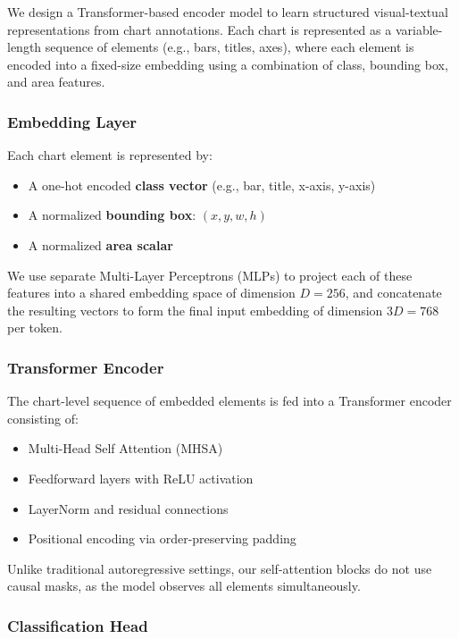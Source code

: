 \documentclass[11pt]{article}
\begin{document}
We design a Transformer-based encoder model to learn structured visual-textual representations from chart annotations. Each chart is represented as a variable-length sequence of elements (e.g., bars, titles, axes), where each element is encoded into a fixed-size embedding using a combination of class, bounding box, and area features.

\subsubsection*{Embedding Layer}

Each chart element is represented by:
\begin{itemize}
    \item A one-hot encoded \textbf{class vector} (e.g., bar, title, x-axis, y-axis)
    \item A normalized \textbf{bounding box}: $(x, y, w, h)$
    \item A normalized \textbf{area scalar}
\end{itemize}

We use separate Multi-Layer Perceptrons (MLPs) to project each of these features into a shared embedding space of dimension $D=256$, and concatenate the resulting vectors to form the final input embedding of dimension $3D=768$ per token.

\subsubsection*{Transformer Encoder}

The chart-level sequence of embedded elements is fed into a Transformer encoder consisting of:
\begin{itemize}
    \item Multi-Head Self Attention (MHSA)
    \item Feedforward layers with ReLU activation
    \item LayerNorm and residual connections
    \item Positional encoding via order-preserving padding
\end{itemize}

Unlike traditional autoregressive settings, our self-attention blocks do not use causal masks, as the model observes all elements simultaneously.

\subsubsection*{Classification Head}
\end{document}
